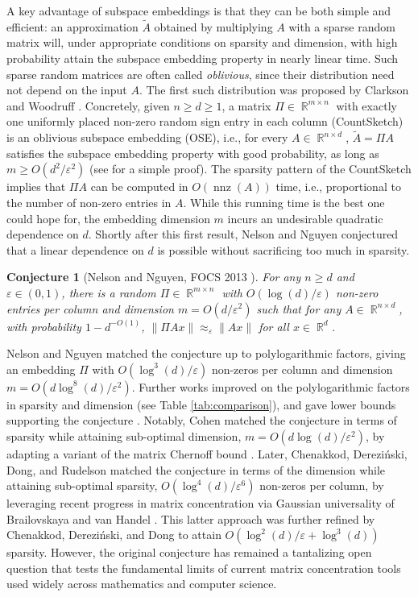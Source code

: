 \documentclass[11pt]{amsart}
\numberwithin{equation}{section}
\numberwithin{equation}{section}
\DeclareMathOperator{\R}{\mathbb{R}}
\DeclareMathOperator{\nnz}{nnz}
\newtheorem{conjecture}[theorem]{Conjecture}
\begin{document}
A key advantage of subspace embeddings is that they can be both simple and efficient: an approximation $\tilde A$ obtained by multiplying $A$ with a sparse random matrix will, under appropriate conditions on sparsity and dimension, with high probability attain the subspace embedding property in nearly linear time. Such sparse random matrices are often called \emph{oblivious}, since their distribution need not depend on the input $A$. The first such distribution was proposed by Clarkson and Woodruff \cite{clarkson2013low}. Concretely, given $n\geq d\geq 1$, a matrix $\Pi\in \R^{m\times n}$ with exactly one uniformly placed non-zero random sign entry in each column (CountSketch) is an oblivious subspace embedding (OSE), i.e., for every $A\in\R^{n\times d}$, $\tilde A=\Pi A$ satisfies the subspace embedding property with good probability, as long as $m\geq O(d^2/\varepsilon^2)$ (see \cite{nelson2013osnap} for a simple proof). The sparsity pattern of the CountSketch implies that $\Pi A$ can be computed in $O(\nnz(A))$ time, i.e., proportional to the number of non-zero entries in $A$.
While this running time is the best one could hope for, the embedding dimension $m$ incurs an undesirable quadratic dependence on $d$. Shortly after this first result, Nelson and Nguyen \cite{nelson2013osnap} conjectured that a linear dependence on $d$ is possible without sacrificing too much in sparsity. 
\begin{conjecture}[Nelson and Nguyen, FOCS 2013 \cite{nelson2013osnap}]\label{c:nn}
    For any $n\geq d$ and $\varepsilon\in(0,1)$, there is a random  $\Pi\in\R^{m\times n}$ with $O(\log(d)/\varepsilon)$ non-zero entries per column and dimension $m=O(d/\varepsilon^2)$ such that for any $A\in\R^{n\times d}$, with probability $1-d^{-O(1)}$, $\|\Pi Ax\|\approx_\varepsilon\|Ax\|$ for all $x\in\R^d$.
\end{conjecture}
Nelson and Nguyen matched the conjecture up to polylogarithmic factors, giving an embedding $\Pi$ with $O(\log^3(d)/\varepsilon)$ non-zeros per column and dimension $m=O(d\log^8(d)/\varepsilon^2)$. Further works improved on the polylogarithmic factors in sparsity and dimension \cite{bourgain2015toward,cohen2016nearly,chenakkod2024optimal,chenakkod2025optimal} (see Table \ref{tab:comparison}), and gave lower bounds supporting the conjecture \cite{nelson2014lower,li2022lower,li2022sparsity}. Notably, Cohen \cite{cohen2016nearly} matched the conjecture in terms of sparsity while attaining sub-optimal dimension, $m=O(d\log(d)/\varepsilon^2)$, by adapting a variant of the matrix Chernoff bound \cite{troppmatrixconc}. Later, Chenakkod, Derezi\'nski, Dong, and Rudelson \cite{chenakkod2024optimal} matched the conjecture in terms of the dimension while attaining sub-optimal sparsity, $O(\log^4(d)/\varepsilon^6)$ non-zeros per column, by leveraging recent progress in matrix concentration via Gaussian universality of Brailovskaya and van Handel \cite{brailovskaya2022universality}. This latter approach was further refined by Chenakkod, Derezi\'nski, and Dong \cite{chenakkod2025optimal} to attain $O(\log^2(d)/\varepsilon+\log^3(d))$ sparsity. However, the original conjecture has remained a tantalizing open question that tests the fundamental limits of current matrix concentration tools used widely across mathematics and computer science.
\end{document}
